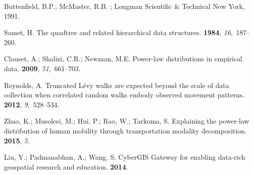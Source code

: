 \documentclass[ijgi,article,accept,moreauthors,pdftex,10pt,a4paper]{mdpi}
\theoremstyle{mdpi}
\newcounter{ex}
\newcounter{re}
\theoremstyle{mdpidefinition}
\begin{document}
\begin{thebibliography}{-------}
Buttenfield, B.P.; McMaster, R.B.
;
  Longman Scientific \& Technical New York,  1991.

Samet, H.
\newblock The quadtree and related hierarchical data structures.
 {\bf 1984}, {\em 16},~187--260.

Clauset, A.; Shalizi, C.R.; Newman, M.E.
\newblock Power-law distributions in empirical data.
 {\bf 2009}, {\em 51},~661--703.

Reynolds, A.
\newblock Truncated L{\'e}vy walks are expected beyond the scale of data
  collection when correlated random walks embody observed movement patterns.
 {\bf 2012}, {\em
  9},~528--534.

Zhao, K.; Musolesi, M.; Hui, P.; Rao, W.; Tarkoma, S.
\newblock Explaining the power-law distribution of human mobility through
  transportation modality decomposition.
 {\bf 2015}, {\em 5}.

Liu, Y.; Padmanabhan, A.; Wang, S.
\newblock CyberGIS Gateway for enabling data-rich geospatial research and
  education.
 {\bf
  2014}.

\end{thebibliography}
\end{document}
